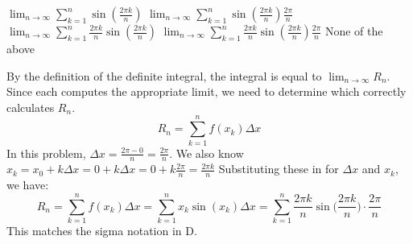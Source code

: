 \documentclass{article}
\begin{document}
\begin{enumerate}
\begin{enumerate}
    
    \begin{enumerate}[label=\protect\maybecircle{\Alph*.}]
      \plainitem $\displaystyle \lim_{n\to\infty} \sum_{k=1}^n \sin(\tfrac{2\pi k}{n})$
      \plainitem $\displaystyle \lim_{n\to\infty} \sum_{k=1}^n\sin(\tfrac{2\pi k}{n})\tfrac{2\pi}{n}$
      \plainitem $\displaystyle \lim_{n\to\infty} \sum_{k=1}^n\tfrac{2\pi k}{n}\sin(\tfrac{2\pi k}{n})$
      \circleitem $\displaystyle \lim_{n\to\infty} \sum_{k=1}^{n}\tfrac{2\pi k}{n}\sin(\tfrac{2\pi k}{n})\tfrac{2\pi}{n}$
      \plainitem None of the above 
      \end{enumerate}

\end{enumerate}

\begin{solution}
    By the definition of the definite integral, the integral is equal to $\lim_{n\to\infty} R_n$. Since each computes the appropriate limit, we need to determine which correctly calculates $R_n$. 
    \[R_n = \sum_{k=1}^n f(x_k)\Delta x\]
    In this problem, $\displaystyle \Delta x = \frac{2\pi-0}{n}=\frac{2\pi}{n}$. We also know $\displaystyle x_k = x_0 + k\Delta x = 0+k\Delta x = 0 + k\frac{2\pi}{n} = \frac{2\pi k}{n}$
    Substituting these in for $\Delta x$ and $x_k$, we have:
     \[R_n = \sum_{k=1}^n f(x_k)\Delta x= \sum_{k=1}^n x_k\sin(x_k)\Delta x = \sum_{k=1}^n \frac{2\pi k}{n} \sin\bigg(\frac{2\pi k}{n}\bigg)\cdot \frac{2\pi}{n}\]
     This matches the sigma notation in D.
\end{solution}
\end{enumerate}


\end{document}
